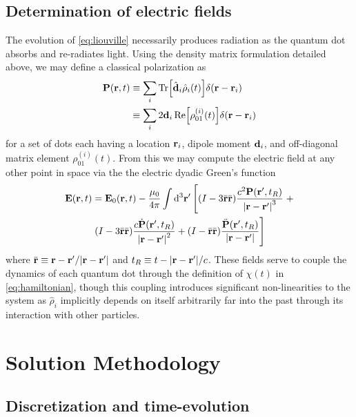 \documentclass[conference]{IEEEtran}
\begin{document}
\subsection{Determination of electric fields}

The evolution of \cref{eq:liouville} necessarily produces radiation as the quantum dot absorbs and re-radiates light.
Using the density matrix formulation detailed above, we may define a classical polarization as
\begin{equation}
  \begin{aligned}
    \vb{P}(\vb{r}, t) &\equiv \sum_i \Tr[\hat{\vb{d}}_i \hat{\rho}_i(t)] \delta(\vb{r} - \vb{r}_i) \\
                      &\equiv \sum_i 2 \vb{d}_i \Re\!\qty[\rho_{01}^{(i)}(t)] \delta(\vb{r} - \vb{r}_i)
  \end{aligned}
  \label{eq:polarization}
\end{equation}
for a set of dots each having a location $\vb{r}_i$, dipole moment $\vb{d}_i$, and off-diagonal matrix element $\rho_{01}^{(i)}(t)$.
From this we may compute the electric field at any other point in space via the the electric dyadic Green's function\cite{Rothwell2008}
\begin{gather}
    \vb{E}(\vb{r}, t) = \vb{E}_0(\vb{r}, t) - \frac{\mu_0}{4\pi} \int \dd[3]{\vb{r}'} \left [ 
      \qty(I - 3\bar{\vb{r}}\bar{\vb{r}}) \frac{c^2 \vb{P}(\vb{r}', t_R)}{\abs{\vb{r} - \vb{r}'}^3} \right . + \nonumber \\
      \left . \qty(I - 3\bar{\vb{r}}\bar{\vb{r}}) \frac{c \dot{\vb{P}}(\vb{r}', t_R)}{\abs{\vb{r} - \vb{r}'}^2} +
      \qty(I -  \bar{\vb{r}}\bar{\vb{r}}) \frac{\ddot{\vb{P}}(\vb{r}', t_R)}{\abs{\vb{r} - \vb{r}'}} \right ] 
  \label{eq:efield}
\end{gather}
where $\bar{\vb{r}} \equiv \vb{r} - \vb{r}'/\abs{\vb{r} - \vb{r}'}$ and $t_R \equiv t - \abs{\vb{r} - \vb{r}'}/c$.
These fields serve to couple the dynamics of each quantum dot through the definition of $\chi(t)$ in \cref{eq:hamiltonian}, though this coupling introduces significant non-linearities to the system as $\hat{\rho}_i$ implicitly depends on itself arbitrarily far into the past through its interaction with other particles.

\section{Solution Methodology}
\subsection{Discretization and time-evolution}
\end{document}
